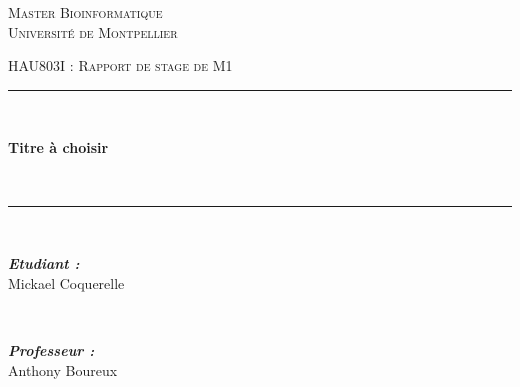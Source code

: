 \begin{titlepage}
{\scshape\LARGE Master Bioinformatique \\ Université de Montpellier\par} %
    \vspace{8mm}
{\scshape\Large HAU803I : Rapport de stage de M1  \par} %
\vspace{1cm}
\rule{\linewidth}{0.5 mm} \\[0.5 cm]
{\huge\bfseries Titre à choisir \par} \
\rule{\linewidth}{0.5 mm} \\[1.5 cm]

\begin{minipage}{0.5\textwidth} %
    \begin{flushleft} \large %
    \emph{\textbf{Etudiant :}}\\ %
    Mickael Coquerelle \\ %
    \end{flushleft}
\end{minipage}
~
\begin{minipage}{0.4\textwidth}
    \begin{flushright} \large
    \emph{\textbf{Professeur :}} \\
     Anthony Boureux \\
    \end{flushright}
\end{minipage}\\

\vspace{2cm}

\begin{quote}
    \itshape
\end{quote}
\vspace{1cm}
\begin{flushright}
    \itshape
\end{flushright}
\vspace{5mm}

\end{titlepage}
